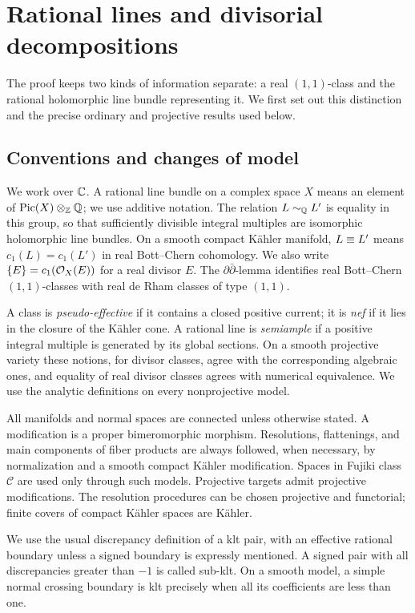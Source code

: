 \section{Rational lines and divisorial decompositions}\label{sec:preliminaries}

The proof keeps two kinds of information separate: a real \((1,1)\)-class
and the rational holomorphic line bundle representing it. We first set
out this distinction and the precise ordinary and projective results used
below.

\subsection{Conventions and changes of model}

We work over \(\mathbb C\). A rational line bundle on a complex space \(X\) means
an element of \(\operatorname{Pic}(X)\otimes_{\mathbb Z}\mathbb Q\); we use additive notation.
The relation \(L\sim_{\mathbb Q} L'\) is equality in this group, so that sufficiently
divisible integral multiples are isomorphic holomorphic line bundles.
On a smooth compact K\"ahler manifold, \(L\equiv L'\) means
\(c_1(L)=c_1(L')\) in real Bott--Chern cohomology. We also write
\(\{E\}=c_1(\mathcal O_X(E))\) for a real divisor \(E\).
The \(\partial\bar\partial\)-lemma identifies real Bott--Chern
\((1,1)\)-classes with real de Rham classes of type \((1,1)\).

A class is \emph{pseudo-effective} if it contains a closed positive current;
it is \emph{nef} if it lies in the closure of the K\"ahler cone.
A rational line is \emph{semiample} if a positive integral multiple is
generated by its global sections. On a smooth projective variety these
notions, for divisor classes, agree with the corresponding algebraic
ones, and equality of real divisor classes agrees with numerical
equivalence. We use the analytic definitions on every nonprojective
model.

All manifolds and normal spaces are connected unless otherwise stated.
A modification is a proper bimeromorphic morphism. Resolutions,
flattenings, and main components of fiber products are always followed,
when necessary, by normalization and a smooth compact K\"ahler
modification. Spaces in Fujiki class \(\mathcal C\) are used only through
such models. Projective targets admit projective modifications. The
resolution procedures can be chosen projective and functorial; finite
covers of compact K\"ahler spaces are K\"ahler.

We use the usual discrepancy definition of a klt pair, with an effective
rational boundary unless a signed boundary is expressly mentioned.
A signed pair with all discrepancies greater than \(-1\) is called
sub-klt. On a smooth model, a simple normal crossing boundary is klt
precisely when all its coefficients are less than one.

